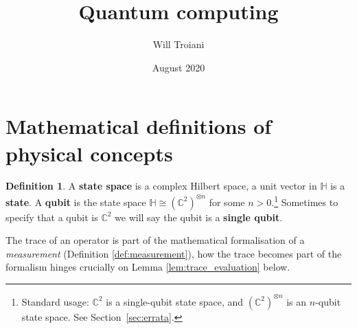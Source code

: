\documentclass[12pt]{article}
\title{Quantum computing}
\author{Will Troiani}
\date{August 2020}
\theoremstyle{plain}
\theoremstyle{definition}
\newtheorem{defn}[thm]{Definition} %
\newcommand{\bb}[1]{\mathbb{#1}}
\begin{document}
\maketitle
\tableofcontents
\section{Mathematical definitions of physical concepts}\label{Sec:Math_defs}
\begin{defn}
A \textbf{state space} is a complex Hilbert space, a unit vector in $\bb{H}$ is a \textbf{state}. A \textbf{qubit} is the state space $\bb{H} \cong (\bb{C}^2)^{\otimes n}$ for some $n > 0$.\footnote{Standard usage: $\bb{C}^2$ is a single-qubit state space, and $(\bb{C}^2)^{\otimes n}$ is an $n$-qubit state space. See Section~\ref{sec:errata}.} Sometimes to specify that a qubit is $\bb{C}^2$ we will say the qubit is a \textbf{single qubit}.
\end{defn}
The trace of an operator is part of the mathematical formalisation of a \emph{measurement} (Definition \ref{def:measurement}), how the trace becomes part of the formalism hinges crucially on Lemma \ref{lem:trace_evaluation} below.
\end{document}
